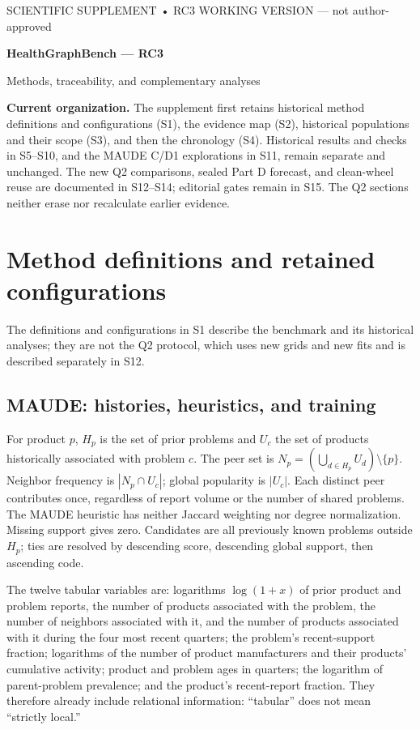 \documentclass[10pt,a4paper]{article}
\begin{document}
\begin{center}
{\small SCIENTIFIC SUPPLEMENT • RC3 WORKING VERSION — not author-approved}\par\vspace{7pt}
{\LARGE\bfseries HealthGraphBench — RC3}\par\vspace{6pt}
{\large Methods, traceability, and complementary analyses}
\end{center}

\textbf{Current organization.} The supplement first retains historical method definitions and configurations (S1), the evidence map (S2), historical populations and their scope (S3), and then the chronology (S4). Historical results and checks in S5--S10, and the MAUDE C/D1 explorations in S11, remain separate and unchanged. The new Q2 comparisons, sealed Part D forecast, and clean-wheel reuse are documented in S12--S14; editorial gates remain in S15. The Q2 sections neither erase nor recalculate earlier evidence.

\par{}
\section{Method definitions and retained configurations}
\label{supp:methods}
The definitions and configurations in S1 describe the benchmark and its historical analyses; they are not the Q2 protocol, which uses new grids and new fits and is described separately in S12.
\subsection{MAUDE: histories, heuristics, and training}
For product $p$, $H_p$ is the set of prior problems and $U_c$ the set of products historically associated with problem $c$. The peer set is $N_p=(\bigcup_{d\in H_p}U_d)\setminus\{p\}$. Neighbor frequency is $|N_p\cap U_c|$; global popularity is $|U_c|$. Each distinct peer contributes once, regardless of report volume or the number of shared problems. The MAUDE heuristic has neither Jaccard weighting nor degree normalization. Missing support gives zero. Candidates are all previously known problems outside $H_p$; ties are resolved by descending score, descending global support, then ascending code\cite{hgbcode}.

The twelve tabular variables are: logarithms $\log(1+x)$ of prior product and problem reports, the number of products associated with the problem, the number of neighbors associated with it, and the number of products associated with it during the four most recent quarters; the problem's recent-support fraction; logarithms of the number of product manufacturers and their products' cumulative activity; product and problem ages in quarters; the logarithm of parent-problem prevalence; and the product's recent-report fraction. They therefore already include relational information: “tabular” does not mean “strictly local.”
\end{document}
